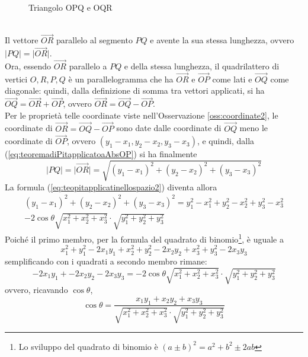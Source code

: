 \documentclass{book}
\newcommand{\abs}[1]{\lvert#1\rvert}
\theoremstyle{definition}
\theoremstyle{plain}
\begin{document}
\begin{figure}[ht!]
  \centering
  \resizebox{4cm}{!}{
      
    }
  \caption{Triangolo OPQ e OQR}
  \label{fig:triangoloOPQeOQR}
\end{figure}\\
Il vettore $\vec{OR}$ parallelo al segmento $PQ$ e avente la sua stessa lunghezza, ovvero $\abs{PQ}=\abs{\vec{OR}}$.\\
Ora, essendo $\vec{OR}$ parallelo a $PQ$ e della stessa lunghezza, il quadrilattero di vertici $O,R,P,Q$ è un parallelogramma che ha $\vec{OR}$ e $\vec{OP}$ come lati e $\vec{OQ}$ come diagonale: quindi, dalla definizione di somma tra vettori applicati, si ha $\vec{OQ}=\vec{OR}+\vec{OP}$, ovvero $\vec{OR}=\vec{OQ}-\vec{OP}$.\\
Per le proprietà telle coordinate viste nell'Osservazione \ref{oss:coordinate2}, le coordinate di $\vec{OR}=\vec{OQ}-\vec{OP}$ sono date dalle coordinate di $\vec{OQ}$ meno le coordinate di $\vec{OP}$, ovvero $(y_1-x_1,y_2-x_2,y_3-x_3)$, e quindi, dalla (\ref{eq:teoremadiPitapplicatoaAbsOP}) si ha finalmente
\begin{equation}
  \label{eq:teopitapplicatinellospazio3}
  \abs{PQ}=\abs{\vec{OR}}=\sqrt{(y_1-x_1)^2+(y_2-x_2)^2+(y_3-x_3)^2}
\end{equation}
La formula (\ref{eq:teopitapplicatinellospazio2}) diventa allora
\begin{equation}
  \label{eq:teopitapplicatinellospazio4}
  \begin{matrix}
    (y_1-x_1)^2+(y_2-x_2)^2+(y_3-x_3)^2=y^2_1-x^2_1+y^2_2-x^2_2+y^2_3-x^2_3\\
    -2\cos\theta\sqrt{x^2_1+x^2_2+x^2_3}\cdot\sqrt{y^2_1+y^2_2+y^2_3}
  \end{matrix}  
\end{equation}
Poiché il primo membro, per la formula del quadrato di binomio\footnote{Lo sviluppo del quadrato di binomio è $(a\pm{}b)^2=a^2+b^2\pm2ab$}, è uguale a
\begin{equation*}
  x^2_1+y^2_1-2x_1y_1+x^2_2+y^2_2-2x_2y_2+x^2_3+y^2_3-2x_3y_3
\end{equation*}
semplificando con i quadrati a secondo membro rimane:
\begin{equation}
  \label{eq:teopitapplicatinellospazio5}
  -2x_1y_1+-2x_2y_2-2x_3y_3=-2\cos\theta\sqrt{x^2_1+x^2_2+x^2_3}\cdot\sqrt{y^2_1+y^2_2+y^2_3}
\end{equation}
ovvero, ricavando $\cos\theta$,
\begin{equation}
  \label{eq:teopitapplicatinellospazio6}
  \cos\theta = \frac{x_1y_1+x_2y_2+x_3y_3}{\sqrt{x^2_1+x^2_2+x^2_3}\cdot\sqrt{y^2_1+y^2_2+y^2_3}}
\end{equation} 
\end{document}
